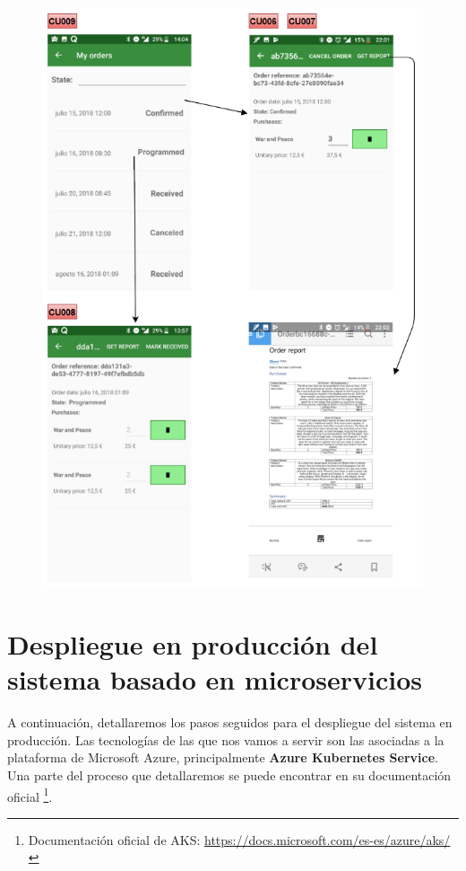 \documentclass[11pt,spanish,listoffigures]{tfgetsinf}
\begin{document}
\begin{figure}[h]
\centering
\includegraphics[scale=1.2]{ModeloUI_Final4}
\end{figure}

%

\chapter{Despliegue en producción del sistema basado en microservicios} \label{chap:Despliegue}

A continuación, detallaremos los pasos seguidos para el despliegue del sistema en producción. Las tecnologías de las que nos vamos a servir son las asociadas a la plataforma de Microsoft Azure, principalmente \textbf{Azure Kubernetes Service}. Una parte del proceso que detallaremos se puede encontrar en su documentación oficial \footnote{ Documentación oficial de AKS: \url{https://docs.microsoft.com/es-es/azure/aks/}}.
\end{document}
